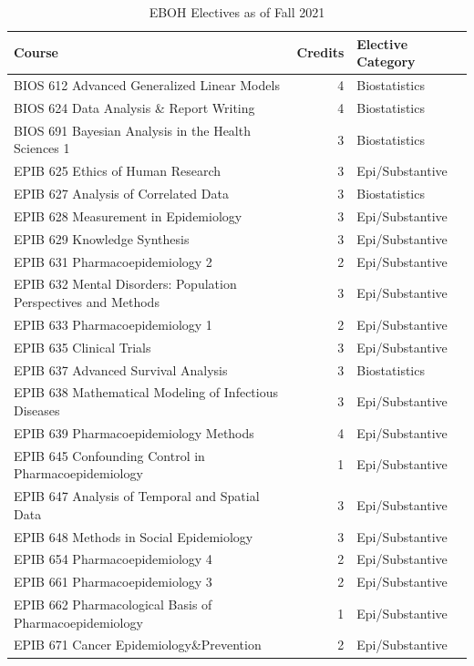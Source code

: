 \documentclass[
]{book}
\begin{document}
\begin{table}

\caption{\label{tab:elect}EBOH Electives as of Fall 2021}
\centering
\begin{tabular}[t]{l|r|l}
\hline
Course & Credits & Elective Category\\
\hline
BIOS 612 Advanced Generalized Linear Models & 4 & Biostatistics\\
\hline
BIOS 624 Data Analysis \& Report Writing & 4 & Biostatistics\\
\hline
BIOS 691 Bayesian Analysis in the Health Sciences 1 & 3 & Biostatistics\\
\hline
EPIB 625 Ethics of Human Research & 3 & Epi/Substantive\\
\hline
EPIB 627 Analysis of Correlated Data & 3 & Biostatistics\\
\hline
EPIB 628 Measurement in Epidemiology & 3 & Epi/Substantive\\
\hline
EPIB 629 Knowledge Synthesis & 3 & Epi/Substantive\\
\hline
EPIB 631 Pharmacoepidemiology 2 & 2 & Epi/Substantive\\
\hline
EPIB 632 Mental Disorders: Population Perspectives and Methods & 3 & Epi/Substantive\\
\hline
EPIB 633 Pharmacoepidemiology 1 & 2 & Epi/Substantive\\
\hline
EPIB 635 Clinical Trials & 3 & Epi/Substantive\\
\hline
EPIB 637 Advanced Survival Analysis & 3 & Biostatistics\\
\hline
EPIB 638 Mathematical Modeling of Infectious Diseases & 3 & Epi/Substantive\\
\hline
EPIB 639 Pharmacoepidemiology Methods & 4 & Epi/Substantive\\
\hline
EPIB 645 Confounding Control in Pharmacoepidemiology & 1 & Epi/Substantive\\
\hline
EPIB 647 Analysis of Temporal and Spatial Data & 3 & Epi/Substantive\\
\hline
EPIB 648 Methods in Social Epidemiology & 3 & Epi/Substantive\\
\hline
EPIB 654 Pharmacoepidemiology 4 & 2 & Epi/Substantive\\
\hline
EPIB 661 Pharmacoepidemiology 3 & 2 & Epi/Substantive\\
\hline
EPIB 662 Pharmacological Basis of Pharmacoepidemiology & 1 & Epi/Substantive\\
\hline
EPIB 671 Cancer Epidemiology\&Prevention & 2 & Epi/Substantive\\

\end{tabular}
\end{table}
\end{document}
